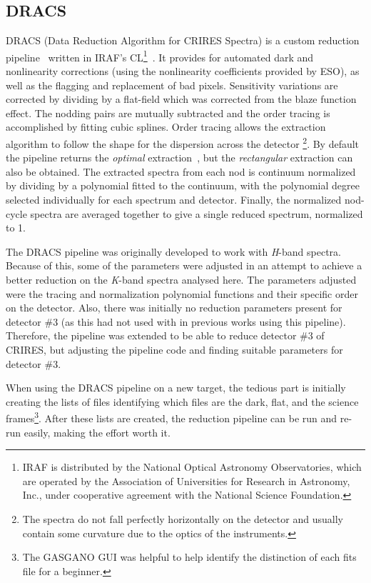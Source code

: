 \subsection{{DRACS}}
\label{subsec:dracs}
{DRACS} (Data Reduction Algorithm for {CRIRES} Spectra) is a custom reduction pipeline~\citep{figueira_radial_2010} written in {IRAF}'s CL\footnote{{IRAF} is distributed by the National Optical Astronomy Observatories, which are operated by the Association of Universities for Research in Astronomy, {Inc.}, under cooperative agreement with the National Science Foundation.}~\citep{tody_iraf_1993}. 
It provides for automated dark and nonlinearity corrections (using the nonlinearity coefficients provided by {ESO}), as well as the flagging and replacement of bad pixels. 
Sensitivity variations are corrected by dividing by a flat-field which was corrected from the blaze function effect. 
The nodding pairs are mutually subtracted and the order tracing is accomplished by fitting cubic splines. 
Order tracing allows the extraction algorithm to follow the shape for the dispersion across the detector \footnote{The spectra do not fall perfectly horizontally on the detector and usually contain some curvature due to the optics of the instruments.}.
By default the pipeline returns the \emph{optimal} extraction~\citep{horne_optimal_1986}, but the \emph{rectangular} extraction can also be obtained. 
The extracted spectra from each nod is continuum normalized by dividing by a polynomial fitted to the continuum, with the polynomial degree selected individually for each spectrum and detector. 
Finally, the normalized nod-cycle spectra are averaged together to give a single reduced spectrum, normalized to 1.

The {DRACS} pipeline was originally developed to work with \emph{H}-band spectra. 
Because of this, some of the parameters were adjusted in an attempt to achieve a better reduction on the \emph{K}-band spectra analysed here. 
The parameters adjusted were the tracing and normalization polynomial functions and their specific order on the detector. 
Also, there was initially no reduction parameters present for detector \#3 (as this had not used with in previous works using this pipeline). 
Therefore, the pipeline was extended to be able to reduce detector \#3 of CRIRES, but adjusting the pipeline code and finding suitable parameters for detector \#3.

When using the {DRACS} pipeline on a new target, the tedious part is initially creating the lists of files identifying which files are the dark, flat, and the science frames\footnote{The GASGANO GUI was helpful to help identify the distinction of each fits file for a beginner.}. 
After these lists are created, the reduction pipeline can be run and re-run easily, making the effort worth it.

